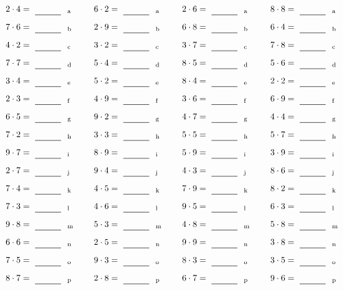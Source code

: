 \documentclass
[
  draft    = true,
  fontsize = 11pt,
  parskip  = half-
]
{scrartcl}
\begin{document}
\par\vfill\par
\begin{align*}
    \pline{2\cdot4}&=\rline{a}
  & \pline{6\cdot2}&=\rline{a}
  & \pline{2\cdot6}&=\rline{a}
  & \pline{8\cdot8}&=\rline{a} \\[1ex]
    \pline{7\cdot6}&=\rline{b}
  & \pline{2\cdot9}&=\rline{b}
  & \pline{6\cdot8}&=\rline{b}
  & \pline{6\cdot4}&=\rline{b} \\[1ex]
    \pline{4\cdot2}&=\rline{c}
  & \pline{3\cdot2}&=\rline{c}
  & \pline{3\cdot7}&=\rline{c}
  & \pline{7\cdot8}&=\rline{c} \\[1ex]
    \pline{7\cdot7}&=\rline{d}
  & \pline{5\cdot4}&=\rline{d}
  & \pline{8\cdot5}&=\rline{d}
  & \pline{5\cdot6}&=\rline{d} \\[1ex]
    \pline{3\cdot4}&=\rline{e}
  & \pline{5\cdot2}&=\rline{e}
  & \pline{8\cdot4}&=\rline{e}
  & \pline{2\cdot2}&=\rline{e} \\[1ex]
    \pline{2\cdot3}&=\rline{f}
  & \pline{4\cdot9}&=\rline{f}
  & \pline{3\cdot6}&=\rline{f}
  & \pline{6\cdot9}&=\rline{f} \\[1ex]
    \pline{6\cdot5}&=\rline{g}
  & \pline{9\cdot2}&=\rline{g}
  & \pline{4\cdot7}&=\rline{g}
  & \pline{4\cdot4}&=\rline{g} \\[1ex]
    \pline{7\cdot2}&=\rline{h}
  & \pline{3\cdot3}&=\rline{h}
  & \pline{5\cdot5}&=\rline{h}
  & \pline{5\cdot7}&=\rline{h} \\[1ex]
    \pline{9\cdot7}&=\rline{i}
  & \pline{8\cdot9}&=\rline{i}
  & \pline{5\cdot9}&=\rline{i}
  & \pline{3\cdot9}&=\rline{i} \\[1ex]
    \pline{2\cdot7}&=\rline{j}
  & \pline{9\cdot4}&=\rline{j}
  & \pline{4\cdot3}&=\rline{j}
  & \pline{8\cdot6}&=\rline{j} \\[1ex]
    \pline{7\cdot4}&=\rline{k}
  & \pline{4\cdot5}&=\rline{k}
  & \pline{7\cdot9}&=\rline{k}
  & \pline{8\cdot2}&=\rline{k} \\[1ex]
    \pline{7\cdot3}&=\rline{l}
  & \pline{4\cdot6}&=\rline{l}
  & \pline{9\cdot5}&=\rline{l}
  & \pline{6\cdot3}&=\rline{l} \\[1ex]
    \pline{9\cdot8}&=\rline{m}
  & \pline{5\cdot3}&=\rline{m}
  & \pline{4\cdot8}&=\rline{m}
  & \pline{5\cdot8}&=\rline{m} \\[1ex]
    \pline{6\cdot6}&=\rline{n}
  & \pline{2\cdot5}&=\rline{n}
  & \pline{9\cdot9}&=\rline{n}
  & \pline{3\cdot8}&=\rline{n} \\[1ex]
    \pline{7\cdot5}&=\rline{o}
  & \pline{9\cdot3}&=\rline{o}
  & \pline{8\cdot3}&=\rline{o}
  & \pline{3\cdot5}&=\rline{o} \\[1ex]
    \pline{8\cdot7}&=\rline{p}
  & \pline{2\cdot8}&=\rline{p}
  & \pline{6\cdot7}&=\rline{p}
  & \pline{9\cdot6}&=\rline{p}
\end{align*}
\end{document}
